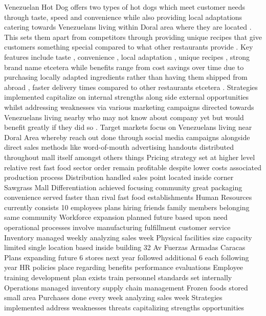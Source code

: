 Venezuelan Hot Dog offers two types of hot dogs which meet customer needs through taste, speed and convenience while also providing local adaptations catering towards Venezuelans living within Doral area where they are located . This sets them apart from competitors through providing unique recipes that give customers something special compared to what other restaurants provide . Key features include taste , convenience , local adaptation , unique recipes , strong brand name etcetera while benefits range from cost savings over time due to purchasing locally adapted ingredients rather than having them shipped from abroad , faster delivery times compared to other restaurants etcetera . Strategies implemented capitalize on internal strengths along side external opportunities whilst addressing weaknesses via various marketing campaigns directed towards Venezuelans living nearby who may not know about company yet but would benefit greatly if they did so . Target markets focus on Venezuelans living near Doral Area whereby reach out done through social media campaigns alongside direct sales methods like word-of-mouth advertising handouts distributed throughout mall itself amongst others things Pricing strategy set at higher level relative rest fast food sector order remain profitable despite lower costs associated production process Distribution handled sales point located inside corner Sawgrass Mall Differentiation achieved focusing community great packaging convenience served faster than rival fast food establishments Human Resources currently consists 10 employees plans hiring friends family members belonging same community Workforce expansion planned future based upon need operational processes involve manufacturing fulfillment customer service Inventory managed weekly analyzing sales week Physical facilities size capacity limited single location based inside building 32 Av Fuerzas Armadas Caracas Plans expanding future 6 stores next year followed additional 6 each following year HR policies place regarding benefits performance evaluations Employee training development plan exists train personnel standards set internally Operations managed inventory supply chain management Frozen foods stored small area Purchases done every week analyzing sales week Strategies implemented address weaknesses threats capitalizing strengths opportunities 


